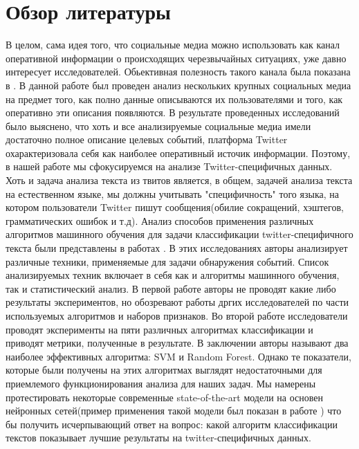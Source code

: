 
\section{Обзор литературы}
В целом, сама идея того, что социальные медиа можно использовать как канал оперативной информации о происходящих черезвычайных ситуациях, уже давно интересует исследователей. Обьективная полезность такого канала была показана в \cite{twitter-source}. В данной работе был проведен анализ нескольких крупных социальных медиа на предмет того, как полно данные описываются их пользователями и того, как оперативно эти описания появляются. В результате проведенных исследований было выяснено, что хоть и все анализируемые социальные медиа имели достаточно полное описание целевых событий, платформа Twitter охарактеризовала себя как наиболее оперативный источик информации. Поэтому, в нашей работе мы сфокусируемся на анализе Twitter-специфичных данных.\\

Хоть и задача анализа текста из твитов является, в общем, задачей анализа текста на естественном языке, мы должны учитывать "специфичность" того языка, на котором пользователи Twitter пишут сообщения(обилие сокращений, хэштегов, грамматических ошибок и т.д). Анализ способов применения различных алгоритмов машинного обучения для задачи классификации twitter-специфичного текста были представлены в работах \cite{event-detection-survey, identifying-disasters}. В этих исследованиях авторы анализирует различные техники, применяемые для задачи обнаружения событий. Список анализируемых техник включает в себя как и алгоритмы машинного обучения, так и статистический анализ. В первой работе авторы не проводят какие либо результаты экспериментов, но обозревают работы дргих исследователей по части используемых алгоритмов и наборов признаков. Во второй работе исследователи проводят эксперименты на пяти различных алгоритмах классификации и приводят метрики, полученные в результате. В заключении авторы называют два наиболее эффективных алгоритма: SVM и Random Forest. Однако те показатели, которые были получены на этих алгоритмах выглядят недостаточными для приемлемого функционирования анализа для наших задач. Мы намерены протестировать некоторые современные state-of-the-art модели на основен нейронных сетей(пример применения такой модели был показан в работе \cite{cnn-crisis}) что бы получить исчерпывающий ответ на вопрос: какой алгоритм классификации текстов показывает лучшие результаты на twitter-специфичных данных.\\


